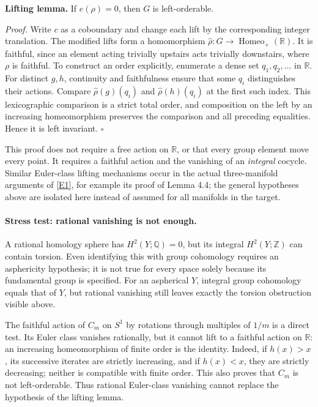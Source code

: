 \documentclass[11pt,a4paper]{article}
\newcommand{\Z}{\mathbb{Z}}
\newcommand{\Q}{\mathbb{Q}}
\newcommand{\R}{\mathbb{R}}
\newcommand{\eref}[2]{\hyperlink{extra:#1:#2}{[E#2]}}
\numberwithin{equation}{section}
\begin{document}
\textbf{Lifting lemma.} If $e(\rho)=0$, then $G$ is left-orderable.

\textit{Proof.} Write $c$ as a coboundary and change each lift by the
corresponding integer translation. The modified lifts form a homomorphism
$\widehat\rho:G\to\operatorname{Homeo}_+(\R)$. It is faithful, since an
element acting trivially upstairs acts trivially downstairs, where $\rho$
is faithful. To construct an order explicitly, enumerate a dense set
$q_1,q_2,\ldots$ in $\R$. For distinct $g,h$, continuity and faithfulness
ensure that some $q_i$ distinguishes their actions. Compare
$\widehat\rho(g)(q_i)$ and $\widehat\rho(h)(q_i)$ at the first such index.
This lexicographic comparison is a strict total order, and composition on
the left by an increasing homeomorphism preserves the comparison and all
preceding equalities. Hence it is left invariant. \hfill$\square$

This proof does not require a free action on $\R$, or that every group
element move every point. It requires a faithful action and the vanishing
of an \emph{integral} cocycle. Similar Euler-class lifting mechanisms
occur in the actual three-manifold arguments of \eref{30006775}{1}, for example
its proof of Lemma 4.4; the general hypotheses above are isolated here
instead of assumed for all manifolds in the target.

\paragraph{Stress test: rational vanishing is not enough.}
A rational homology sphere has $H^2(Y;\Q)=0$, but its integral
$H^2(Y;\Z)$ can contain torsion. Even identifying this with group
cohomology requires an asphericity hypothesis; it is not true for every
space solely because its fundamental group is specified. For an
aspherical $Y$, integral group cohomology equals that of $Y$, but rational
vanishing still leaves exactly the torsion obstruction visible above.

The faithful action of $C_m$ on $S^1$ by rotations through multiples of
$1/m$ is a direct test. Its Euler class vanishes rationally, but it cannot
lift to a faithful action on $\R$: an increasing homeomorphism of finite
order is the identity. Indeed, if $h(x)>x$, its successive iterates are
strictly increasing, and if $h(x)<x$, they are strictly decreasing; neither
is compatible with finite order. This also proves that $C_m$ is not
left-orderable. Thus rational Euler-class vanishing cannot replace the
hypothesis of the lifting lemma.
\end{document}
